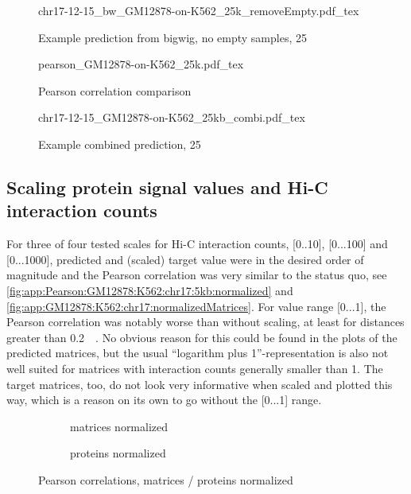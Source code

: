 \begin{figure}[hp]
 \centering
 \scriptsize
 {chr17-12-15_bw_GM12878-on-K562_25k_removeEmpty.pdf_tex}
 \caption{Example prediction from bigwig, no empty samples, \SI{25}{\kilo\bp}}
 \label{fig:results:bigwig:noemptysamples:25k}
\end{figure}
\begin{figure}[hp]
 \centering
 \scriptsize
 {pearson_GM12878-on-K562_25k.pdf_tex}
 \caption{Pearson correlation comparison}
 \label{fig:results:bigwig:Pearson25k}
\end{figure}
\begin{figure}[hp]
 \centering
 \scriptsize
 {chr17-12-15_GM12878-on-K562_25kb_combi.pdf_tex}
 \caption{Example combined prediction, \SI{25}{\kilo\bp}}
 \label{fig:results:combined:chr17:25k}
\end{figure}

\subsection{Scaling protein signal values and Hi-C interaction counts} \label{sec:res:normalization}
For three of four tested scales for Hi-C interaction counts, [0..10], [0...100] and [0...1000],
predicted and (scaled) target value were in the desired order of magnitude and 
the Pearson correlation was very similar to the status quo, 
see \autoref{fig:app:Pearson:GM12878:K562:chr17:5kb:normalized} and 
\ref{fig:app:GM12878:K562:chr17:normalizedMatrices}.
For value range [0...1], the Pearson correlation was notably worse than without scaling, 
at least for distances greater than \SI{0.2}{\mega\bp}.
No obvious reason for this could be found in the plots of the predicted matrices, 
but the usual ``logarithm plus 1''-representation is also not well suited 
for matrices with interaction counts generally smaller than 1. 
The target matrices, too, do not look very informative when scaled and plotted this way,
which is a reason on its own to go without the [0...1] range.
\begin{figure}[hb]
 \centering
 \begin{subfigure}{.495\textwidth}
  \centering
  \caption{matrices normalized}
  \label{fig:app:Pearson:GM12878:K562:chr17:5kb:normalized}
 \end{subfigure}\hfill
\begin{subfigure}{.495\textwidth}
  \centering
  \caption{proteins normalized}
  \label{fig:app:Pearson:GM12878:K562:chr17:5kb:protsNormalized}
 \end{subfigure}
 \caption{Pearson correlations, matrices / proteins normalized}
 \label{fig:res:Pearson:matrices:proteins:normalized:5kb}
\end{figure}

